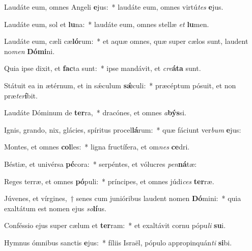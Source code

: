 \item Laudáte eum, omnes Angeli \textbf{e}jus:~* laudáte eum, omnes virtú\textit{tes} \textbf{e}jus.
\item Laudáte eum, sol et \textbf{lu}na:~* laudáte eum, omnes stellæ \textit{et} \textbf{lu}men.
\item Laudáte eum, cæli cæ\textbf{ló}rum:~* et aquæ omnes, quæ super cælos sunt, laudent no\textit{men} \textbf{Dó}\textbf{mi}ni.
\item Quia ipse dixit, et \textbf{fac}ta sunt:~* ipse mandávit, et \textit{cre}\textbf{á}\textbf{ta} sunt.
\item Státuit ea in ætérnum, et in sǽculum \textbf{sǽ}culi:~* præcéptum pósuit, et non præ\textit{ter}\textbf{í}bit.
\item Laudáte Dóminum de \textbf{ter}ra,~* dracónes, et omnes \textit{a}\textbf{býs}si.
\item Ignis, grando, nix, glácies, spíritus procel\textbf{lá}rum:~* quæ fáciunt ver\textit{bum} \textbf{e}jus:
\item Montes, et omnes \textbf{col}les:~* ligna fructífera, et om\textit{nes} \textbf{ce}dri.
\item Béstiæ, et univérsa \textbf{pé}cora:~* serpéntes, et vólucres \textit{pen}\textbf{ná}tæ:
\item Reges terræ, et omnes \textbf{pó}puli:~* príncipes, et omnes júdi\textit{ces} \textbf{ter}ræ.
\item Júvenes, et vírgines,~† senes cum junióribus laudent nomen \textbf{Dó}mini:~* quia exaltátum est nomen ejus \textit{so}\textbf{lí}us.
\item Conféssio ejus super cælum et \textbf{ter}ram:~* et exaltávit cornu pópu\textit{li} \textbf{su}i.
\item Hymnus ómnibus sanctis \textbf{e}jus:~* fíliis Israël, pópulo appropinquán\textit{ti} \textbf{si}bi.
